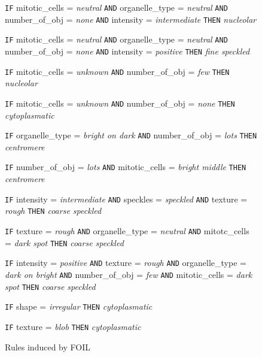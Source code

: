 \begin{figure}
\begin{algorithmic}[1]
			\State \texttt{IF} mitotic\_cells = \textit{neutral} \texttt{AND} organelle\_type = \textit{neutral} \texttt{AND} number\_of\_obj = \textit{none} \texttt{AND} intensity = \textit{intermediate}
			\Statex \texttt{THEN} \textit{nucleolar}
			
			\State \texttt{IF} mitotic\_cells = \textit{neutral} \texttt{AND} organelle\_type = \textit{neutral} \texttt{AND} number\_of\_obj = \textit{none} \texttt{AND} intensity = \textit{positive}
			\Statex \texttt{THEN} \textit{fine speckled}
			
			\State \texttt{IF} mitotic\_cells = \textit{unknown} \texttt{AND} number\_of\_obj = \textit{few} 
			\Statex \texttt{THEN} \textit{nucleolar}
			
			\State \texttt{IF} mitotic\_cells = \textit{unknown} \texttt{AND} number\_of\_obj = \textit{none} 
			\Statex \texttt{THEN} \textit{cytoplasmatic}
			
		\end{algorithmic}
\end{figure}


\begin{figure}
	\caption{Rules induced by FOIL }
	\label{fig:RulesFOIL}
	\small
	\centering
	
		\begin{algorithmic}[1]
			\State \texttt{IF} organelle\_type = \textit{bright on dark} \texttt{AND} number\_of\_obj = \textit{lots} 
			\Statex \texttt{THEN} \textit{centromere}
			
			\State \texttt{IF} number\_of\_obj = \textit{lots} \texttt{AND} mitotic\_cells = \textit{bright middle}
			\Statex \texttt{THEN} \textit{centromere}
			
			\State \texttt{IF} intensity = \textit{intermediate} \texttt{AND} speckles = \textit{speckled} \texttt{AND} texture = \textit{rough}
			\Statex \texttt{THEN} \textit{coarse speckled}
			
			\State \texttt{IF} texture = \textit{rough} \texttt{AND} organelle\_type = \textit{neutral} \texttt{AND} mitotc\_cells = \textit{dark spot}
			\Statex \texttt{THEN} \textit{coarse speckled}
			
			\State \texttt{IF} intensity = \textit{positive} \texttt{AND} texture = \textit{rough} \texttt{AND} organelle\_type = \textit{dark on bright} \texttt{AND} number\_of\_obj = \textit{few} \texttt{AND} mitotic\_cells = \textit{dark spot}
			\Statex \texttt{THEN} \textit{coarse speckled}
			
			\State \texttt{IF} shape = \textit{irregular}
			\Statex \texttt{THEN} \textit{cytoplasmatic}
			
			\State \texttt{IF} texture = \textit{blob}
			\Statex \texttt{THEN} \textit{cytoplasmatic}
			
		\end{algorithmic}
	
\end{figure}